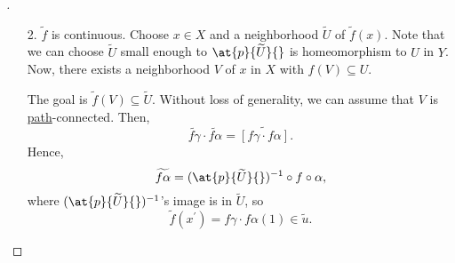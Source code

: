 \begin{proof}[\unskip\nopunct]
	\begin{enumerate}
		\item[2.] \(\widetilde{f} \) is continuous. Choose \(x\in X\) and a neighborhood \(\widetilde{U} \) of
			\(\widetilde{f} (x)\). Note that we can choose \(\widetilde{U} \) small enough to \(\at{p}{\widetilde{U} }{} \) is homeomorphism
			to \(U\) in \(Y\). Now, there exists a neighborhood \(V\) of \(x\) in \(X\) with \(f(V)\subseteq U\).
			\begin{figure}[H]
				\centering
				\label{fig:pf:prop:lifting-criterion-2}
			\end{figure}
			The goal is \(\widetilde{f} (V)\subseteq \widetilde{U}\). Without loss of generality, we can assume that
			\(V\) is \hyperref[def:path]{path}-connected. Then,
			\[
				\widetilde{f \gamma } \cdot \widetilde{f \alpha } = \widetilde{\left[f \gamma \cdot f \alpha \right]}.
			\]
			Hence,
			\[
				\widetilde{f \alpha } = (\at{p}{\widetilde{U} }{})^{-1} \circ f\circ \alpha,
			\]
			where \((\at{p}{\widetilde{U} }{})^{-1}\)'s image is in \(\widetilde{U} \), so
			\[
				\widetilde{f} (x ^\prime ) = f \gamma \cdot f \alpha (1)\in \widetilde{u}.
			\]
	\end{enumerate}
\end{proof}

